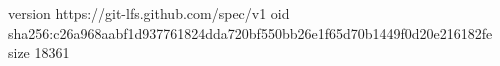version https://git-lfs.github.com/spec/v1
oid sha256:c26a968aabf1d937761824dda720bf550bb26e1f65d70b1449f0d20e216182fe
size 18361
